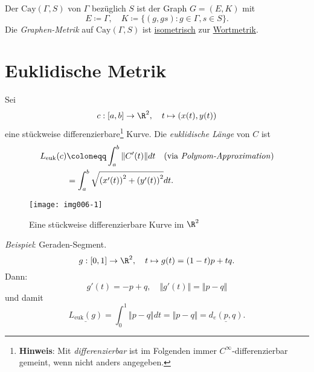 \begin{definition}
  Der  $ \text{Cay}(\Gamma, S) $ von $ \Gamma $ bezüglich $ S $ ist der Graph $ G = (E, K) $ mit
  \begin{equation*}
    E \coloneqq \Gamma, \quad K \coloneqq \{ (g, gs) : g \in \Gamma, s \in S \}\text{.}
  \end{equation*}
  Die \emph{Graphen-Metrik} auf $ \text{Cay}(\Gamma, S) $ ist \hyperref[def:isometrie]{isometrisch} zur \hyperref[def:wortmetrik]{Wortmetrik}.
\end{definition}

\section{Euklidische Metrik}
\begin{example}
  Sei
  \begin{equation*}
    c : [a,b] \to \R^2, \quad t \mapsto (x(t), y(t))
  \end{equation*}
  eine stückweise differenzierbare\footnote{\textbf{Hinweis}: Mit \emph{differenzierbar} ist im Folgenden immer $ C^\infty $-differenzierbar gemeint, wenn nicht anders angegeben.} Kurve.
  Die \emph{euklidische Länge} von $ C $ ist
  \begin{align*}
    L_{\text{euk}}(c) &\coloneqq \int_a^b \Vert C'(t) \Vert dt \quad \text{(via \emph{Polynom-Approximation})} \\
     &= \int_a^b \sqrt{\left( x'(t) \right)^2 + \left( y'(t) \right)^2}dt\text{.}
  \end{align*}
  \begin{figure}[H]
    \label{img006-1}
    \texttt{[image: img006-1]}
    \caption{Eine stückweise differenzierbare Kurve im $ \R^2 $}
  \end{figure}
  \emph{Beispiel}: Geraden-Segment.
  \begin{equation*}
    g: [0,1] \to \R^2, \quad t \mapsto g(t) = (1-t)p + tq\text{.}
  \end{equation*}
  Dann:
  \begin{equation*}
    g'(t) = -p+q, \quad \Vert g'(t) \Vert = \Vert p - q \Vert
  \end{equation*}
  und damit
  \begin{equation*}
    \underline{L_{\text{euk}}(g)} = \int_0^1\Vert p - q \Vert dt = \Vert p - q \Vert = \underline{d_e(p,q)}\text{.}
  \end{equation*}
\end{example}

